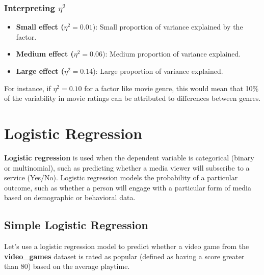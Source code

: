 \documentclass[
]{book}
\providecommand{\tightlist}{%
  \setlength{\itemsep}{0pt}\setlength{\parskip}{0pt}}
\begin{document}
\subsubsection*{\texorpdfstring{Interpreting \(\eta^2\)}{Interpreting \textbackslash eta\^{}2}}\label{interpreting-eta2}

\begin{itemize}
\tightlist
\item
  \textbf{Small effect (}\(\eta^2 = 0.01\)): Small proportion of variance explained by the factor.
\item
  \textbf{Medium effect (}\(\eta^2 = 0.06\)): Medium proportion of variance explained.
\item
  \textbf{Large effect (}\(\eta^2 = 0.14\)): Large proportion of variance explained.
\end{itemize}

For instance, if \(\eta^2 = 0.10\) for a factor like movie genre, this would mean that 10\% of the variability in movie ratings can be attributed to differences between genres.

\section{Logistic Regression}\label{logistic-regression}

\textbf{Logistic regression} is used when the dependent variable is categorical (binary or multinomial), such as predicting whether a media viewer will subscribe to a service (Yes/No). Logistic regression models the probability of a particular outcome, such as whether a person will engage with a particular form of media based on demographic or behavioral data.

\subsection*{Simple Logistic Regression}\label{simple-logistic-regression}

Let's use a logistic regression model to predict whether a video game from the \textbf{video\_games} dataset is rated as popular (defined as having a score greater than 80) based on the average playtime.
\end{document}
